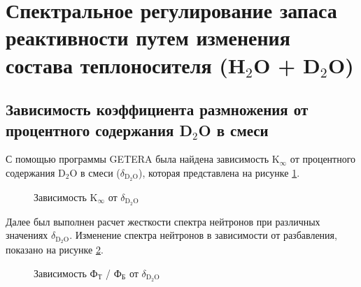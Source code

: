 \documentclass[a4paper]{article}
\begin{document}
	
	\section*{Спектральное регулирование запаса реактивности путем изменения состава теплоносителя (H$_2$O + D$_2$O)}
	
	\subsection*{Зависимость коэффициента размножения от процентного содержания D$_2$O в смеси}
	
	С помощью программы GETERA была найдена зависимость K$_{\infty}$ от процентного содержания D$_2$O в смеси ($\delta_{\text{D}_{2}\text{O}}$), которая представлена на рисунке \ref{ris:deltaOtK}.
	
	\begin{figure}[h]
		\caption{Зависимость K$_{\infty}$ от $\delta_{\text{D}_{2}\text{O}}$}
		\label{ris:deltaOtK}
	\end{figure}

	Далее был выполнен расчет жесткости спектра нейтронов при различных значениях $\delta_{\text{D}_{2}\text{O}}$. Изменение спектра нейтронов в зависимости от разбавления, показано на рисунке \ref{ris:spectr}.
	
	\begin{figure}[h]
		\caption{Зависимость Ф$_\text{Т}$ / Ф$_\text{Б}$ от $\delta_{\text{D}_{2}\text{O}}$}
		\label{ris:spectr}
	\end{figure}
	
\end{document}
